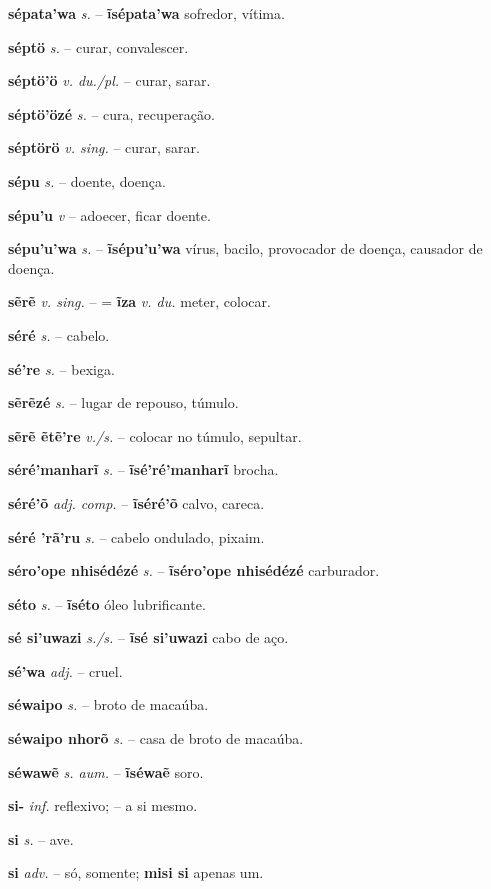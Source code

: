 \textbf{sépata'wa} \textit{s.} -- \textbf{ĩsépata'wa} sofredor, vítima.

\textbf{séptö} \textit{s.} -- curar, convalescer.

\textbf{séptö'ö} \textit{v. du./pl.} -- curar, sarar.

\textbf{séptö'özé} \textit{s.} -- cura, recuperação.

\textbf{séptörö} \textit{v. sing.} -- curar, sarar.

\textbf{sépu} \textit{s.} -- doente, doença.

\textbf{sépu'u} \textit{v} -- adoecer, ficar doente.

\textbf{sépu'u'wa} \textit{s.} -- \textbf{ĩsépu'u'wa} vírus, bacilo, provocador de doença, causador de doença.

\textbf{sẽrẽ} \textit{v. sing.} -- = \textbf{ĩza} \textit{v. du.} meter, colocar.

\textbf{séré} \textit{s.} -- cabelo.

\textbf{sé're} \textit{s.} -- bexiga.

\textbf{sẽrẽzé} \textit{s.} -- lugar de repouso, túmulo.

\textbf{sẽrẽ ẽtẽ're} \textit{v./s.} -- colocar no túmulo, sepultar.

\textbf{séré'manharĩ} \textit{s.} -- \textbf{ĩsé'ré'manharĩ} brocha.

\textbf{séré'õ} \textit{adj. comp.} -- \textbf{ĩséré'õ} calvo, careca.

\textbf{séré 'rã'ru} \textit{s.} -- cabelo ondulado, pixaim.

\textbf{séro'ope nhisédézé} \textit{s.} -- \textbf{ĩséro'ope nhisédézé} carburador.

\textbf{séto} \textit{s.} -- \textbf{ĩséto} óleo lubrificante.

\textbf{sé si'uwazi} \textit{s./s.} -- \textbf{ĩsé si'uwazi} cabo de aço.

\textbf{sé'wa} \textit{adj.} -- cruel.

\textbf{séwaipo} \textit{s.} -- broto de macaúba.

\textbf{séwaipo nhorõ} \textit{s.} -- casa de broto de macaúba.

\textbf{séwawẽ} \textit{s. aum.} -- \textbf{ĩséwaẽ} soro.

\textbf{si-} \textit{inf.} reflexivo; -- a si mesmo.

\textbf{si} \textit{s.} -- ave.

\textbf{si} \textit{adv.} -- só, somente; \textbf{misi si} apenas um.

